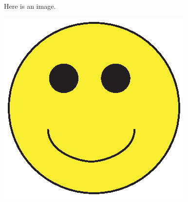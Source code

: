\documentclass{article}
\begin{document}
Here is an image.

\includegraphics{my.image.eps}

\cite{foo}



\end{document}
